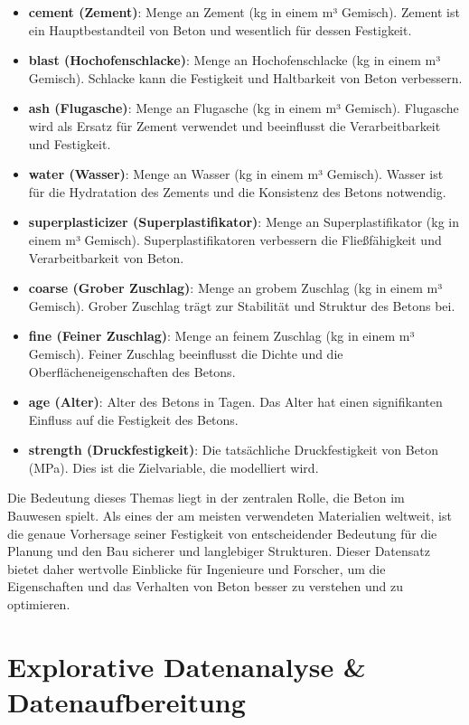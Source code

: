 \begin{itemize}
    \item \textbf{cement (Zement)}: Menge an Zement (kg in einem m³ Gemisch). Zement ist ein Hauptbestandteil von Beton und wesentlich für dessen Festigkeit.
    \item \textbf{blast (Hochofenschlacke)}: Menge an Hochofenschlacke (kg in einem m³ Gemisch). Schlacke kann die Festigkeit und Haltbarkeit von Beton verbessern.
    \item \textbf{ash (Flugasche)}: Menge an Flugasche (kg in einem m³ Gemisch). Flugasche wird als Ersatz für Zement verwendet und beeinflusst die Verarbeitbarkeit und Festigkeit.
    \item \textbf{water (Wasser)}: Menge an Wasser (kg in einem m³ Gemisch). Wasser ist für die Hydratation des Zements und die Konsistenz des Betons notwendig.
    \item \textbf{superplasticizer (Superplastifikator)}: Menge an Superplastifikator (kg in einem m³ Gemisch). Superplastifikatoren verbessern die Fließfähigkeit und Verarbeitbarkeit von Beton.
    \item \textbf{coarse (Grober Zuschlag)}: Menge an grobem Zuschlag (kg in einem m³ Gemisch). Grober Zuschlag trägt zur Stabilität und Struktur des Betons bei.
    \item \textbf{fine (Feiner Zuschlag)}: Menge an feinem Zuschlag (kg in einem m³ Gemisch). Feiner Zuschlag beeinflusst die Dichte und die Oberflächeneigenschaften des Betons.
    \item \textbf{age (Alter)}: Alter des Betons in Tagen. Das Alter hat einen signifikanten Einfluss auf die Festigkeit des Betons.
    \item \textbf{strength (Druckfestigkeit)}: Die tatsächliche Druckfestigkeit von Beton (MPa). Dies ist die Zielvariable, die modelliert wird.
\end{itemize}
 
Die Bedeutung dieses Themas liegt in der zentralen Rolle, die Beton im Bauwesen spielt. 
Als eines der am meisten verwendeten Materialien weltweit, ist die genaue Vorhersage seiner Festigkeit von entscheidender 
Bedeutung für die Planung und den Bau sicherer und langlebiger Strukturen. Dieser Datensatz bietet daher wertvolle Einblicke für Ingenieure und Forscher, 
um die Eigenschaften und das Verhalten von Beton besser zu verstehen und zu optimieren.

\section{Explorative Datenanalyse \& Datenaufbereitung}

